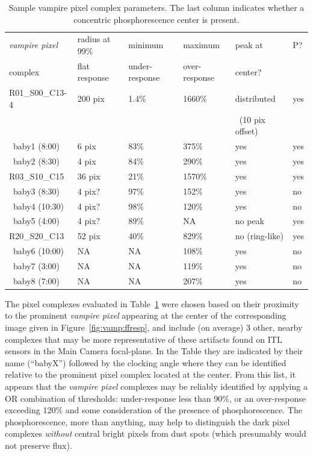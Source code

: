 \begin{table}[h!]
\caption{Sample vampire pixel complex parameters. The last column indicates whether a concentric phosphorescence center is present.}
\label{tab:vamp:samples}
\centering
\begin{tabular}{llllll}
\toprule
{\it vampire pixel}& radius at 99\% & minimum& maximum& peak at & P?\\
complex & flat response & under-response & over-response & center?\\
\midrule
R01\_S00\_C13-4 & 200 pix & 1.4\%&1660\% & distributed & yes\\
                &         &      &       &~(10 pix offset)&\\
~baby1 (8:00)   & 6 pix   & 83\% & 375\% & yes & yes \\
~baby2 (8:30)   & 4 pix   & 84\% & 290\% & yes & yes \\
R03\_S10\_C15   & 36 pix  & 21\% & 1570\%& yes & yes \\
~baby3 (8:30)   & 4 pix?  & 97\% & 152\% & yes & no \\
~baby4 (10:30)  & 4 pix?  & 98\% & 120\% & yes & no \\
~baby5 (4:00)   & 4 pix?  & 89\% & NA    & no peak & yes \\
R20\_S20\_C13   & 52 pix  & 40\% & 829\% & no (ring-like) & yes \\
~baby6 (10:00)  & NA      & NA   & 108\% & yes & no \\
~baby7 (3:00)   & NA      & NA   & 119\% & yes & no \\
~baby8 (7:00)   & NA      & NA   & 207\% & yes & no \\
\bottomrule
\end{tabular}
\end{table}


The pixel complexes evaluated in Table~\ref{tab:vamp:samples} were chosen based on their proximity to the prominent {\it vampire pixel} appearing at the center of the corresponding image given in Figure~\ref{fig:vamp:ffresp}, and include (on average) 3 other, nearby complexes that may be more representative of these artifacts found on ITL sensors in the Main Camera focal-plane. In the Table they are indicated by their name (``babyX'') followed by the clocking angle where they can be identified relative to the prominent pixel complex located at the center. From this list, it appears that the {\it vampire pixel} complexes may be reliably identified by applying a OR combination of thresholds: under-response less than 90\%, or an over-response exceeding 120\% and some consideration of the presence of phosphorescence. The phosphorescence, more than anything, may help to distinguish the dark pixel complexes {\it without} central bright pixels from dust spots (which presumably would not preserve flux). 

